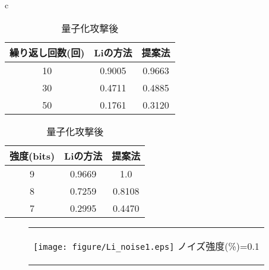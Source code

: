 \documentclass[11pt]{jreport}
\begin{document}
{\begin{table}[htbp]
\begin{center}
\begin{tabular}{c}
    \end{tabular}
  \end{center}
\end{table}



\begin{table}[htbp]
  \begin{center}
    \begin{tabular}{c}

      \begin{minipage}{0.5\hsize}
        \begin{center}
          \caption{平滑化攻撃後}
          \begin{tabular}{c|c|c}
          \hline
    繰り返し回数(回) & Liの方法 & 提案法\\ \hline \hline
10 & 0.9005 & 0.9663 \\
                                30  & 0.4711 & 0.4885 \\ 
         50  & 0.1761 & 0.3120 \\ \hline
          \end{tabular}
        \end{center}
      \end{minipage}

      \begin{minipage}{0.5\hsize}
        \begin{center}
          \caption{量子化攻撃後}
          \begin{tabular}{c|c|c}
            \hline
            強度(bits) & Liの方法 & 提案法 \\ \hline \hline
            9 & 0.9669 & 1.0 \\
            8 & 0.7259 & 0.8108 \\
            7 & 0.2995 & 0.4470 \\ \hline
          \end{tabular}
        \end{center}
      \end{minipage}

    \end{tabular}
  \end{center}
\end{table}


\begin{figure}[htbp]
  \begin{center}
    \begin{tabular}{c}

      \begin{minipage}{0.33\hsize}
        \begin{center}
          \texttt{[image: figure/Li\_noise1.eps]}
          \hspace{1.6cm} ノイズ強度(\%)=0.1
        \end{center}
      \end{minipage}


\end{tabular}
\end{center}
\end{figure}}
\end{document}
